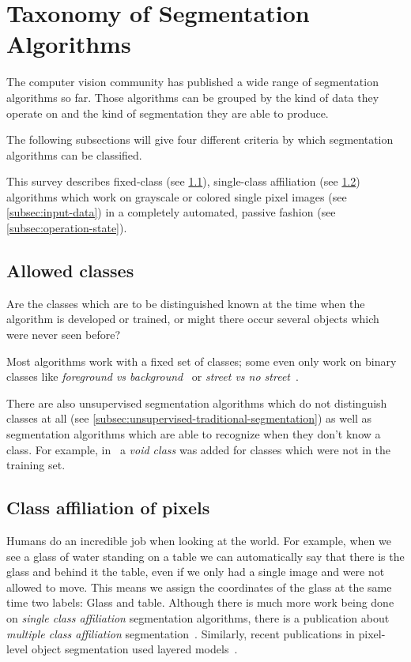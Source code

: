 
\section{Taxonomy of Segmentation Algorithms}\label{sec:taxonomy}
The computer vision community has published a wide range of segmentation
algorithms so far. Those algorithms can be grouped by the kind of data they
operate on and the kind of segmentation they are able to produce.

The following subsections will give four different criteria by which
segmentation algorithms can be classified.

This survey describes fixed-class (see \cref{subsec:allowed-classes}),
single-class affiliation (see \cref{subsec:class-affiliation}) algorithms which
work on grayscale or colored single pixel images (see \cref{subsec:input-data})
in a completely automated, passive fashion (see \cref{subsec:operation-state}).

\subsection{Allowed classes}\label{subsec:allowed-classes}
Are the classes which are to be distinguished known at the time when the
algorithm is developed or trained, or might there occur several objects which
were never seen before?

Most algorithms work with a fixed set of classes; some even only work on binary
classes like \textit{foreground vs
background}~\cite{4228537,carreira2010constrained} or \textit{street vs no
street}~\cite{bittel2015pixel}.

There are also unsupervised segmentation algorithms which do not distinguish
classes at all (see \cref{subsec:unsupervised-traditional-segmentation}) as
well as segmentation algorithms which are able to recognize when they don't
know a class. For example, in~\cite{gould2008multi} a
\textit{void class} was added for classes which were not in the training set.


\subsection{Class affiliation of pixels}\label{subsec:class-affiliation}
Humans do an incredible job when looking at the world. For example, when we
see a glass of water standing on a table we can automatically say that there is
the glass and behind it the table, even if we only had a single image and were
not allowed to move. This means we assign the coordinates of the glass at the
same time two labels: Glass and table. Although there is much more work being
done on \textit{single class affiliation} segmentation algorithms, there is a
publication about \textit{multiple class affiliation}
segmentation~\cite{levin2008spectral}. Similarly, recent publications in
pixel-level object segmentation used layered models~\cite{yang2012layered}.


